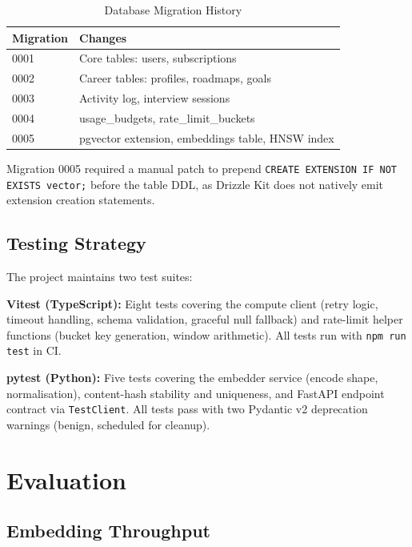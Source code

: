 \documentclass[conference]{IEEEtran}
\begin{document}
\begin{table}[htbp]
\caption{Database Migration History}
\label{tab:migrations}
\centering
\begin{tabular}{ll}
\toprule
\textbf{Migration} & \textbf{Changes} \\
\midrule
0001 & Core tables: users, subscriptions \\
0002 & Career tables: profiles, roadmaps, goals \\
0003 & Activity log, interview sessions \\
0004 & usage\_budgets, rate\_limit\_buckets \\
0005 & pgvector extension, embeddings table, HNSW index \\
\bottomrule
\end{tabular}
\end{table}

Migration 0005 required a manual patch to prepend
\texttt{CREATE EXTENSION IF NOT EXISTS vector;} before the table DDL,
as Drizzle Kit does not natively emit extension creation statements.

\subsection{Testing Strategy}

The project maintains two test suites:

\textbf{Vitest (TypeScript):} Eight tests covering the compute client
(retry logic, timeout handling, schema validation, graceful null fallback)
and rate-limit helper functions (bucket key generation, window arithmetic).
All tests run with \texttt{npm run test} in CI.

\textbf{pytest (Python):} Five tests covering the embedder service
(encode shape, normalisation), content-hash stability and uniqueness,
and FastAPI endpoint contract via \texttt{TestClient}. All tests pass
with two Pydantic v2 deprecation warnings (benign, scheduled for cleanup).

\section{Evaluation}
\label{sec:eval}

\subsection{Embedding Throughput}
\end{document}
